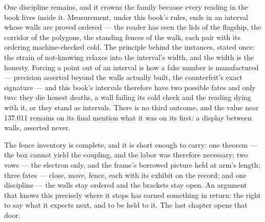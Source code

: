 One discipline remains, and it crowns the family because every reading in the book
lives inside it. Measurement, under this book's rules, ends in an interval whose
walls are proved ordered --- the reader has seen the lids of the flagship, the
corridor of the polygons, the standing fences of the walk, each pair with its
ordering machine-checked cold. The principle behind the instances, stated once: the
strain of not-knowing relaxes into the interval's width, and the width is the
honesty. Forcing a point out of an interval is how a fake number is manufactured
--- precision asserted beyond the walls actually built, the counterfeit's exact
signature --- and this book's intervals therefore have two possible fates and only
two: they die honest deaths, a wall failing its cold check and the reading dying
with it, or they stand as intervals. There is no third outcome, and the value near
137.011 remains on its final mention what it was on its first: a display between
walls, asserted never.

The fence inventory is complete, and it is short enough to carry: one theorem ---
the box cannot yield the coupling, and the labor was therefore necessary; two vows
--- the electron only, and the frame's borrowed picture held at arm's length; three
fates --- close, move, fence, each with its exhibit on the record; and one
discipline --- the walls stay ordered and the brackets stay open. An argument that
knows this precisely where it stops has earned something in return: the right to
say what it expects next, and to be held to it. The last chapter opens that door.
